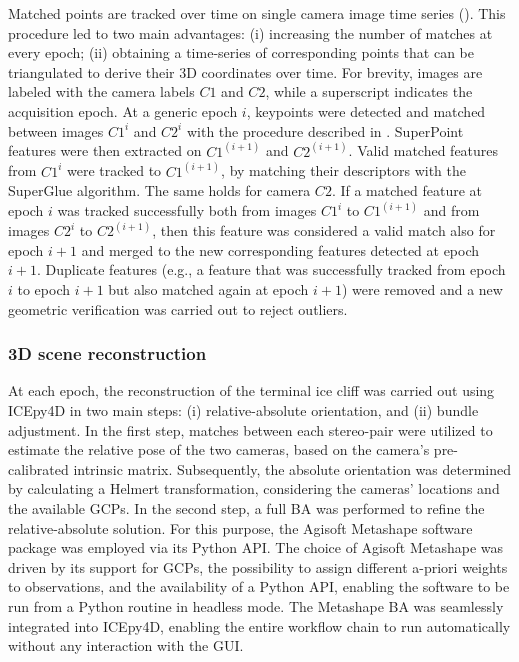 Matched points are tracked over time on single camera image time series
().
This procedure led to two main advantages: (i) increasing the number of matches
at every epoch; (ii) obtaining a time-series of corresponding points that can be
triangulated to derive their 3D coordinates over time.
For brevity, images are labeled with the camera labels \(C1\) and \(C2\), while a
superscript indicates the acquisition epoch.
At a generic epoch \(i\), keypoints were detected and
matched between images \(C1^i\) and \(C2^i\) with the procedure described
in .
SuperPoint features were then extracted on \(C1^{(i+1)}\) and \(C2^{(i+1)}\).
Valid matched features from \(C1^i\) were tracked to \(C1^{(i+1)}\), by matching their
descriptors with the SuperGlue algorithm.
The same holds for camera \(C2\).
If a matched feature at epoch \(i\) was tracked successfully both from images
\(C1^i\) to \(C1^{(i+1)}\) and from images \(C2^i\) to \(C2^{(i+1)}\), then this feature
was considered a valid match also for epoch \(i+1\) and merged to the new corresponding
features detected at epoch \(i+1\).
Duplicate features (e.g., a feature that was successfully tracked from epoch \(i\) to
epoch \(i+1\) but also matched again at epoch \(i+1\)) were removed and a new geometric
verification was carried out to reject outliers.

\subsubsection{3D scene reconstruction}\label{sec:4:3dreconstruction}

At each epoch, the reconstruction of the terminal ice cliff was carried out using ICEpy4D
in two main steps: (i) relative-absolute orientation, and (ii) bundle adjustment.
In the first step, matches between each stereo-pair were utilized to estimate the
relative pose of the two cameras, based on the camera's pre-calibrated intrinsic matrix.
Subsequently, the absolute orientation was determined by calculating a Helmert
transformation, considering the cameras' locations and the available GCPs.
In the second step, a full BA was performed to refine the relative-absolute solution. For this purpose, the Agisoft Metashape software package was employed via its Python API.
The choice of Agisoft Metashape was driven by its support for GCPs, the possibility to
assign different a-priori weights to observations, and the availability of a Python API,
enabling the software to be run from a Python routine in headless mode.
The Metashape BA was seamlessly integrated into ICEpy4D, enabling the entire workflow
chain to run automatically without any interaction with the GUI.

